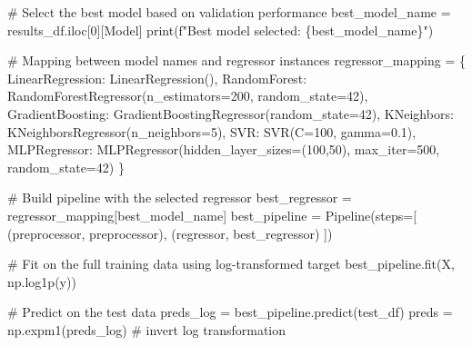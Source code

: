 \documentclass[
]{article}
\newenvironment{Shaded}{\begin{snugshade}}{\end{snugshade}}
\newcommand{\BuiltInTok}[1]{\textcolor[rgb]{0.00,0.23,0.31}{#1}}
\newcommand{\CommentTok}[1]{\textcolor[rgb]{0.37,0.37,0.37}{#1}}
\newcommand{\DecValTok}[1]{\textcolor[rgb]{0.68,0.00,0.00}{#1}}
\newcommand{\FloatTok}[1]{\textcolor[rgb]{0.68,0.00,0.00}{#1}}
\newcommand{\NormalTok}[1]{\textcolor[rgb]{0.00,0.23,0.31}{#1}}
\newcommand{\OperatorTok}[1]{\textcolor[rgb]{0.37,0.37,0.37}{#1}}
\newcommand{\SpecialCharTok}[1]{\textcolor[rgb]{0.37,0.37,0.37}{#1}}
\newcommand{\SpecialStringTok}[1]{\textcolor[rgb]{0.13,0.47,0.30}{#1}}
\newcommand{\StringTok}[1]{\textcolor[rgb]{0.13,0.47,0.30}{#1}}
\begin{document}
\begin{Shaded}
\begin{Highlighting}[]
\CommentTok{\# Select the best model based on validation performance}
\NormalTok{best\_model\_name }\OperatorTok{=}\NormalTok{ results\_df.iloc[}\DecValTok{0}\NormalTok{][}\StringTok{\textquotesingle{}Model\textquotesingle{}}\NormalTok{]}
\BuiltInTok{print}\NormalTok{(}\SpecialStringTok{f"Best model selected: }\SpecialCharTok{\{}\NormalTok{best\_model\_name}\SpecialCharTok{\}}\SpecialStringTok{"}\NormalTok{)}

\CommentTok{\# Mapping between model names and regressor instances}
\NormalTok{regressor\_mapping }\OperatorTok{=}\NormalTok{ \{}
    \StringTok{\textquotesingle{}LinearRegression\textquotesingle{}}\NormalTok{: LinearRegression(),}
    \StringTok{\textquotesingle{}RandomForest\textquotesingle{}}\NormalTok{: RandomForestRegressor(n\_estimators}\OperatorTok{=}\DecValTok{200}\NormalTok{, random\_state}\OperatorTok{=}\DecValTok{42}\NormalTok{),}
    \StringTok{\textquotesingle{}GradientBoosting\textquotesingle{}}\NormalTok{: GradientBoostingRegressor(random\_state}\OperatorTok{=}\DecValTok{42}\NormalTok{),}
    \StringTok{\textquotesingle{}KNeighbors\textquotesingle{}}\NormalTok{: KNeighborsRegressor(n\_neighbors}\OperatorTok{=}\DecValTok{5}\NormalTok{),}
    \StringTok{\textquotesingle{}SVR\textquotesingle{}}\NormalTok{: SVR(C}\OperatorTok{=}\DecValTok{100}\NormalTok{, gamma}\OperatorTok{=}\FloatTok{0.1}\NormalTok{),}
    \StringTok{\textquotesingle{}MLPRegressor\textquotesingle{}}\NormalTok{: MLPRegressor(hidden\_layer\_sizes}\OperatorTok{=}\NormalTok{(}\DecValTok{100}\NormalTok{,}\DecValTok{50}\NormalTok{), max\_iter}\OperatorTok{=}\DecValTok{500}\NormalTok{, random\_state}\OperatorTok{=}\DecValTok{42}\NormalTok{)}
\NormalTok{\}}

\CommentTok{\# Build pipeline with the selected regressor}
\NormalTok{best\_regressor }\OperatorTok{=}\NormalTok{ regressor\_mapping[best\_model\_name]}
\NormalTok{best\_pipeline }\OperatorTok{=}\NormalTok{ Pipeline(steps}\OperatorTok{=}\NormalTok{[}
\NormalTok{    (}\StringTok{\textquotesingle{}preprocessor\textquotesingle{}}\NormalTok{, preprocessor),}
\NormalTok{    (}\StringTok{\textquotesingle{}regressor\textquotesingle{}}\NormalTok{, best\_regressor)}
\NormalTok{])}

\CommentTok{\# Fit on the full training data using log{-}transformed target}
\NormalTok{best\_pipeline.fit(X, np.log1p(y))}

\CommentTok{\# Predict on the test data}
\NormalTok{preds\_log }\OperatorTok{=}\NormalTok{ best\_pipeline.predict(test\_df)}
\NormalTok{preds }\OperatorTok{=}\NormalTok{ np.expm1(preds\_log)  }\CommentTok{\# invert log transformation}


\end{Highlighting}
\end{Shaded}
\end{document}
